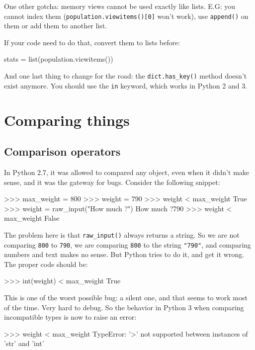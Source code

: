 One other gotcha: memory views cannot be used exactly like lists. E.G: you cannot index them (\lstinline{population.viewitems()[0]} won't work), use \lstinline{append()} on them or add them to another list.

If your code need to do that, convert them to lists before:

\begin{py3}
stats = list(population.viewitems())
\end{py3}

And one last thing to change for the road: the \lstinline{dict.has_key()} method doesn't exist anymore. You should use the \lstinline{in} \gls{keyword}, which works in Python 2 and 3.

\section{Comparing things}

\subsection{Comparison operators}

In Python 2.7, it was allowed to compared any object, even when it didn't make sense, and it was the gateway for bugs. Consider the following snippet:

\begin{py2}
>>> max_weight = 800
>>> weight = 790
>>> weight < max_weight
True
>>> weight = raw_input("How much ?")
How much ?790
>>> weight < max_weight
False
\end{py2}

The problem here is that \lstinline{raw_input()} always returns a string. So we are not comparing \lstinline{800} to \lstinline{790}, we are comparing \lstinline{800} to the string \lstinline{"790"}, and comparing numbers and text makes no sense. But Python tries to do it, and get it wrong. The proper code should be:

\begin{py2}
>>> int(weight) < max_weight
True
\end{py2}

This is one of the worst possible bug: a silent one, and that seems to work most of the time. Very hard to debug. So the behavior in Python 3 when comparing incompatible types is now to raise an error:

\begin{py3}
>>> weight < max_weight
TypeError: '>' not supported between instances of 'str' and 'int'
\end{py3}

